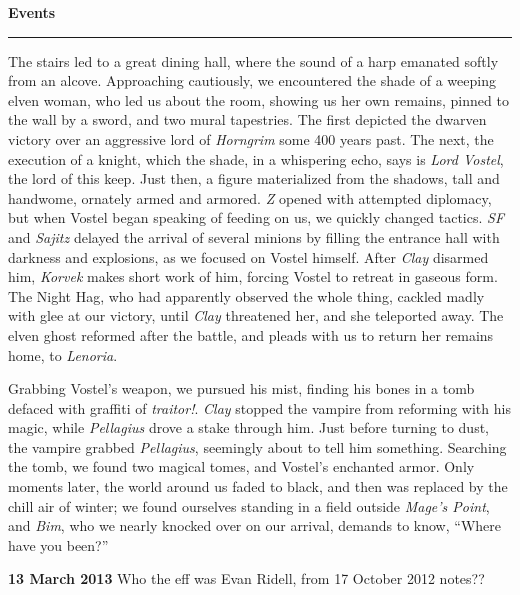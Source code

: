\documentclass[letterpaper]{article}
\newcommand{\e}[1]{\emph{#1}}
\newcommand{\B}[1]{\textbf{#1}}
\newenvironment{notesection}[1]
{ {\huge \B{#1}}\hrule\vspace{0.5em}\begingroup\fontsize{9pt}{12pt}\selectfont}
{\endgroup}
\begin{document}
\begin{notesection}{Events}
The stairs led to a great dining hall, where the sound of a harp emanated softly from an alcove.  Approaching cautiously, we encountered the shade of a weeping elven woman, who led us about the room, showing us her own remains, pinned to the wall by a sword, and two mural tapestries.  The first depicted the dwarven victory over an aggressive lord of \e{Horngrim} some 400 years past.  The next, the execution of a knight, which the shade, in a whispering echo, says is \e{Lord Vostel}, the lord of this keep.  Just then, a figure materialized from the shadows, tall and handwome, ornately armed and armored.  \e{Z} opened with attempted diplomacy, but when Vostel began speaking of feeding on us, we quickly changed tactics.  \e{SF} and \e{Sajitz} delayed the arrival of several minions by filling the entrance hall with darkness and explosions, as we focused on Vostel himself.  After \e{Clay} disarmed him, \e{Korvek} makes short work of him, forcing Vostel to retreat in gaseous form. The Night Hag, who had apparently observed the whole thing, cackled madly with glee at our victory, until \e{Clay} threatened her, and she teleported away. The elven ghost reformed after the battle, and pleads with us to return her remains home, to \e{Lenoria}.

Grabbing Vostel's weapon, we pursued his mist, finding his bones in a tomb defaced with graffiti of \e{traitor!}.  \e{Clay} stopped the vampire from reforming with his magic, while \e{Pellagius} drove a stake through him.  Just before turning to dust, the vampire grabbed \e{Pellagius}, seemingly about to tell him something.  Searching the tomb, we found two magical tomes, and Vostel's enchanted armor. Only moments later, the world around us faded to black, and then was replaced by the chill air of winter; we found ourselves standing in a field outside \e{Mage's Point}, and \e{Bim}, who we nearly knocked over on our arrival, demands to know, ``Where have you been?''

\B{13 March 2013}
Who the eff was Evan Ridell, from 17 October 2012 notes??
\end{notesection}
\end{document}
